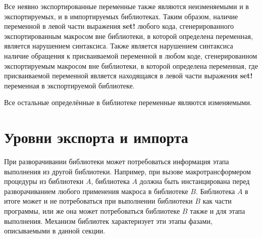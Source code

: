Все неявно экспортированные переменные также являются неизменяемыми и в экспортируемых, и в
импортируемых библиотеках. Таким образом, наличие переменной в левой части выражения
{\cf\bfseries set!} любого кода, сгенерированного экспортированным макросом вне библиотеки, в
которой определена переменная, является нарушением синтаксиса. Также является нарушением
синтаксиса наличие обращения к присваиваемой переменной в любом коде, сгенерированном
экспортируемым макросом вне библиотеки, в которой определена переменная, где присваиваемой
переменной является находящаяся в левой части выражения {\cf\bfseries set!} переменная в
экспортируемой библиотеке.\vspace{-1.2mm}

Все остальные определённые в библиотеке переменные являются изменяемыми.\vspace{-5.4mm}

\section{Уровни экспорта и импорта}\vspace{-3.2mm}
\label{phasessection}

При разворачивании библиотеки может потребоваться информация этапа выполнения из другой
библиотеки. Например, при вызове макротрансформером процедуры из библиотеки $A$, библиотека
$A$ должна быть инстанцирована перед разворачиванием любого применения макроса в библиотеке
$B$. Библиотека $A$ в итоге может и не потребоваться при выполнении библиотеки $B$ как части
программы, или же она может потребоваться библиотеке $B$ также и для этапа выполнения.
Механизм библиотек характеризует эти этапы фазами, описываемыми в данной секции.\vspace{-1.2mm}

